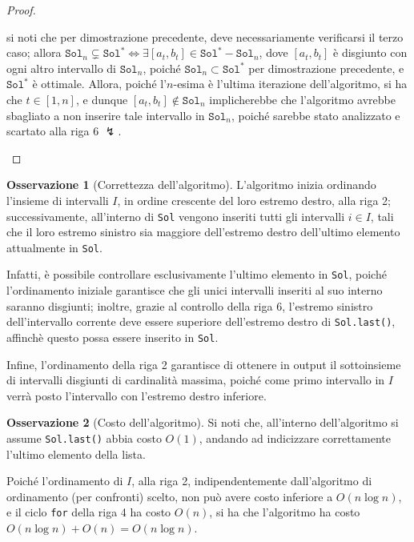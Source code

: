 \documentclass[14pt]{extreport}
\theoremstyle{definition}
\theoremstyle{definition}
\newtheorem{remark}{Osservazione}[subsection]
\begin{document}
\begin{proof}
\begin{itemize}
            si noti che per dimostrazione precedente, deve necessariamente verificarsi il terzo caso; allora $\texttt{Sol}_n \subsetneq \texttt{Sol}^* \iff \exists[a_t, b_t] \in \texttt{Sol}^* - \texttt{Sol}_n$, dove $[a_t, b_t]$ è disgiunto con ogni altro intervallo di $\texttt{Sol}_n$, poiché $\texttt{Sol}_n \subset \texttt{Sol}^*$ per dimostrazione precedente, e $\texttt{Sol}^*$ è ottimale. Allora, poiché l'$n$-esima è l'ultima iterazione dell'algoritmo, si ha che $t \in [1, n]$, e dunque $[a_t, b_t] \notin \texttt{Sol}_n$ implicherebbe che l'algoritmo avrebbe sbagliato a non inserire tale intervallo in $\texttt{Sol}_n$, poiché sarebbe stato analizzato e scartato alla riga 6 $\lightning$.
    \end{itemize}
\end{proof}

\begin{remark}[Correttezza dell'algoritmo]
    L'algoritmo inizia ordinando l'insieme di intervalli $I$, in ordine crescente del loro estremo destro, alla riga 2; successivamente, all'interno di \texttt{Sol} vengono inseriti tutti gli intervalli $i \in I$, tali che il loro estremo sinistro sia maggiore dell'estremo destro dell'ultimo elemento attualmente in \texttt{Sol}.

    Infatti, è possibile controllare esclusivamente l'ultimo elemento in \texttt{Sol}, poiché l'ordinamento iniziale garantisce che gli unici intervalli inseriti al suo interno saranno disgiunti; inoltre, grazie al controllo della riga 6, l'estremo sinistro dell'intervallo corrente deve essere superiore dell'estremo destro di \texttt{Sol.last()}, affinchè questo possa essere inserito in \texttt{Sol}.

    Infine, l'ordinamento della riga 2 garantisce di ottenere in output il sottoinsieme di intervalli disgiunti di cardinalità massima, poiché come primo intervallo in $I$ verrà posto l'intervallo con l'estremo destro inferiore.
\end{remark}

\begin{remark}[Costo dell'algoritmo]
    Si noti che, all'interno dell'algoritmo si assume \texttt{Sol.last()} abbia costo $O(1)$, andando ad indicizzare correttamente l'ultimo elemento della lista.

    Poiché l'ordinamento di $I$, alla riga 2, indipendentemente dall'algoritmo di ordinamento (per confronti) scelto, non può avere costo inferiore a $O(n \log n)$, e il ciclo \texttt{for} della riga 4 ha costo $O(n)$, si ha che l'algoritmo ha costo $O(n \log n) + O(n) = O(n \log n)$.
\end{remark}
\end{document}
